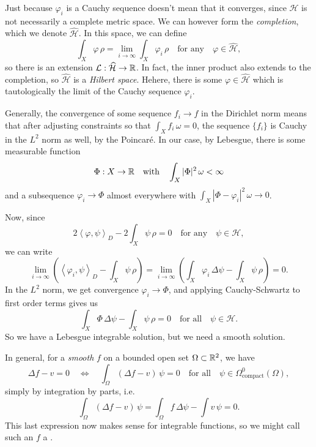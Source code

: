 \documentclass{lkx_paper}
\begin{document}
Just because $\varphi_i$ is a Cauchy sequence doesn't mean that it converges, since $\mathcal{H}$ is not necessarily a complete metric space. We can however form the \emph{completion}, which we denote $\widehat{\mathcal{H}}$. In this space, we can define
\[
	\int_X \varphi\,\rho = \lim_{i\to \infty}\int_X \varphi_i\,\rho \quad\textrm{for any}\quad \varphi \in \widehat{\mathcal{H}},
\]
so there is an extension $\mathcal{L} : \widehat{\mathcal{H}} \to \mathbb{R}$. In fact, the inner product also extends to the completion, so $\widehat{\mathcal{H}}$ is a \emph{Hilbert space}.
Hehere, there is some $\varphi\in \widehat{\mathcal{H}}$ which is tautologically the limit of the Cauchy sequence $\varphi_i$.

Generally, the convergence of some sequence $f_i\to f$ in the Dirichlet norm means that after adjusting constraints so that $\int_X f_i\,\omega=0$, the sequence $\{f_i\}$ is Cauchy in the $L^2$ norm as well, by the Poincar\'e. In our case, by Lebesgue, there is some measurable function
\[
	\Phi : X \to \mathbb{R} \quad\textrm{with}\quad \int_X |\Phi|^2\,\omega < \infty
\]
and a subsequence $\varphi_i \to \Phi$ almost everywhere with $\int_X |\Phi - \varphi_i|^2\,\omega \to 0$.

Now, since
\[
	2\left\langle \varphi, \psi\right\rangle_D - 2\int_X \psi\,\rho = 0\quad\textrm{for any}\quad \psi\in \mathcal{H},
\]
we can write
\[
	\lim_{i\to \infty}\left(\left\langle \varphi_i, \psi\right\rangle_D - \int_X \psi\,\rho\right) =
	\lim_{i\to \infty}\left(\int_X \varphi_i \,\Delta \psi - \int_X \psi\,\rho\right) = 0.
\]
In the $L^2$ norm, we get convergence $\varphi_i \to \Phi$, and applying Cauchy-Schwartz to first order terms gives us
\[
	\int_X \Phi\,\Delta \psi - \int_X \psi\,\rho = 0\quad\textrm{for all}\quad \psi\in \mathcal{H}.
\]
So we have a Lebesgue integrable solution, but we need a smooth solution.

In general, for a \emph{smooth} $f$ on a bounded open set $\Omega\subset \mathbb{R}^2$, we have
\[
	\Delta f - v = 0\quad\iff\quad \int_{\Omega} (\Delta f - v)\,\psi = 0 \quad\textrm{for all}\quad\psi\in \Omega^0_{\textrm{compact}}(\Omega),
\]
simply by integration by parts, i.e.
\[
	\int_\Omega (\Delta f - v)\,\psi = \int_{\Omega} f\,\Delta\psi - \int v\,\psi = 0.
\]
This last expression now makes sense for integrable functions, so we might call such an $f$ a .
\end{document}

